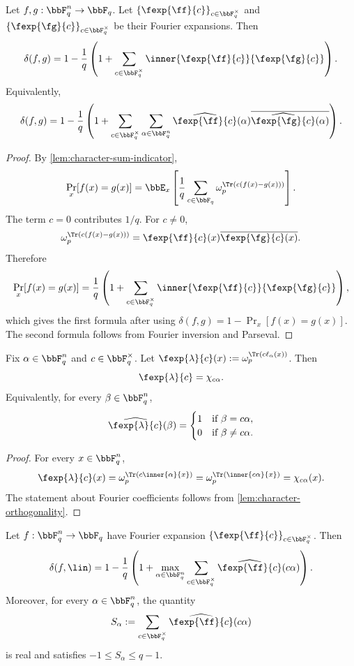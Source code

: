 \begin{lemma}
\label{lem:distance-formula}
Let $f,g:\bbF_q^n\to\bbF_q$.
Let $\{\fexp{\ff}{c}\}_{c\in\bbF_q^\times}$ and
$\{\fexp{\fg}{c}\}_{c\in\bbF_q^\times}$ be their Fourier expansions.
Then
\[
    \delta(f,g)
    = 1-\frac{1}{q}\left(1+
        \sum_{c\in\bbF_q^\times}
        \inner{\fexp{\ff}{c}}{\fexp{\fg}{c}}
    \right).
\]
Equivalently,
\[
    \delta(f,g)
    = 1-\frac{1}{q}\left(1+
        \sum_{c\in\bbF_q^\times}
        \sum_{\alpha\in\bbF_q^n}
        \widehat{\fexp{\ff}{c}}(\alpha)
        \overline{\widehat{\fexp{\fg}{c}}(\alpha)}
    \right).
\]
\end{lemma}

\begin{proof}
By \cref{lem:character-sum-indicator},
\[
    \Pr_x[f(x)=g(x)]
    = \bbE_x\left[\frac{1}{q}\sum_{c\in\bbF_q}
        \omega_p^{\Tr(c(f(x)-g(x)))}\right].
\]
The term $c=0$ contributes $1/q$. For $c\ne 0$,
\[
    \omega_p^{\Tr(c(f(x)-g(x)))}
    = \fexp{\ff}{c}(x)\overline{\fexp{\fg}{c}(x)}.
\]
Therefore
\[
    \Pr_x[f(x)=g(x)]
    =\frac{1}{q}\left(1+\sum_{c\in\bbF_q^\times}
        \inner{\fexp{\ff}{c}}{\fexp{\fg}{c}}
    \right),
\]
which gives the first formula after using
$\delta(f,g)=1-\Pr_x[f(x)=g(x)]$.
The second formula follows from Fourier inversion and Parseval.
\end{proof}

\begin{lemma}
\label{lem:linear-function-fourier-expansion}
Fix $\alpha\in\bbF_q^n$ and $c\in\bbF_q^\times$.
Let $\fexp{\lambda}{c}(x):=\omega_p^{\Tr(c\ell_\alpha(x))}$.
Then
\[
    \fexp{\lambda}{c}=\chi_{c\alpha}.
\]
Equivalently, for every $\beta\in\bbF_q^n$,
\[
    \widehat{\fexp{\lambda}{c}}(\beta)
    =
    \begin{cases}
        1 & \text{if } \beta=c\alpha,\\
        0 & \text{if } \beta\ne c\alpha.
    \end{cases}
\]
\end{lemma}

\begin{proof}
For every $x\in\bbF_q^n$,
\[
    \fexp{\lambda}{c}(x)
    = \omega_p^{\Tr(c\inner{\alpha}{x})}
    = \omega_p^{\Tr(\inner{c\alpha}{x})}
    = \chi_{c\alpha}(x).
\]
The statement about Fourier coefficients follows from
\cref{lem:character-orthogonality}.
\end{proof}

\begin{lemma}
\label{lem:distance-to-linearity-fourier}
Let $f:\bbF_q^n\to\bbF_q$ have Fourier expansion
$\{\fexp{\ff}{c}\}_{c\in\bbF_q^\times}$. Then
\[
    \delta(f,\lin)
    = 1-\frac{1}{q}\left(1+
        \max_{\alpha\in\bbF_q^n}
        \sum_{c\in\bbF_q^\times}
        \widehat{\fexp{\ff}{c}}(c\alpha)
    \right).
\]
Moreover, for every $\alpha\in\bbF_q^n$, the quantity
\[
    S_\alpha := \sum_{c\in\bbF_q^\times}
        \widehat{\fexp{\ff}{c}}(c\alpha)
\]
is real and satisfies $-1\le S_\alpha\le q-1$.
\end{lemma}

